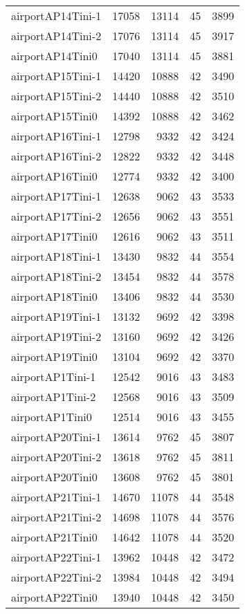 \begin{longtable}{lrrrr}
airportAP14Tini-1 & 17058 & 13114 & 45 & 3899 \\
airportAP14Tini-2 & 17076 & 13114 & 45 & 3917 \\
airportAP14Tini0 & 17040 & 13114 & 45 & 3881 \\
airportAP15Tini-1 & 14420 & 10888 & 42 & 3490 \\
airportAP15Tini-2 & 14440 & 10888 & 42 & 3510 \\
airportAP15Tini0 & 14392 & 10888 & 42 & 3462 \\
airportAP16Tini-1 & 12798 & 9332 & 42 & 3424 \\
airportAP16Tini-2 & 12822 & 9332 & 42 & 3448 \\
airportAP16Tini0 & 12774 & 9332 & 42 & 3400 \\
airportAP17Tini-1 & 12638 & 9062 & 43 & 3533 \\
airportAP17Tini-2 & 12656 & 9062 & 43 & 3551 \\
airportAP17Tini0 & 12616 & 9062 & 43 & 3511 \\
airportAP18Tini-1 & 13430 & 9832 & 44 & 3554 \\
airportAP18Tini-2 & 13454 & 9832 & 44 & 3578 \\
airportAP18Tini0 & 13406 & 9832 & 44 & 3530 \\
airportAP19Tini-1 & 13132 & 9692 & 42 & 3398 \\
airportAP19Tini-2 & 13160 & 9692 & 42 & 3426 \\
airportAP19Tini0 & 13104 & 9692 & 42 & 3370 \\
airportAP1Tini-1 & 12542 & 9016 & 43 & 3483 \\
airportAP1Tini-2 & 12568 & 9016 & 43 & 3509 \\
airportAP1Tini0 & 12514 & 9016 & 43 & 3455 \\
airportAP20Tini-1 & 13614 & 9762 & 45 & 3807 \\
airportAP20Tini-2 & 13618 & 9762 & 45 & 3811 \\
airportAP20Tini0 & 13608 & 9762 & 45 & 3801 \\
airportAP21Tini-1 & 14670 & 11078 & 44 & 3548 \\
airportAP21Tini-2 & 14698 & 11078 & 44 & 3576 \\
airportAP21Tini0 & 14642 & 11078 & 44 & 3520 \\
airportAP22Tini-1 & 13962 & 10448 & 42 & 3472 \\
airportAP22Tini-2 & 13984 & 10448 & 42 & 3494 \\
airportAP22Tini0 & 13940 & 10448 & 42 & 3450 \\

\end{longtable}
